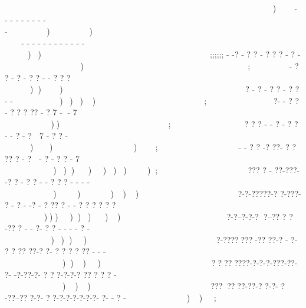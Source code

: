)-- -  - -  -  -  -  - -))   - - - - -  - - - - - - -       )) ; ; ; ; ; ;       - -? - ?  ? - ? ?  ? - ? -          ) ;     - ? ? - ?  - ?  ? - - ?  ? ?                  )))     ? - ?  - ?  ?  - ?   ?  - -                      ))));  ?-  - ?  ?  - ?  ? ? ?? - ?  7   -     -    7         )) ; ? ? ? - - ? - ? ? -   - ?   - ?    7 - ? ? -             )));  - -  ?  ? -? ??- ? ? ??  ? -  ?  - ?   - ?  ? -  7       ))))))));  ??? ?  - ??-???- -?  ?  - ? ?    - - ? ? ?  -  -   - -     )))))  ?-?-?????-? ?-???- ? - ? -  -? - ? ?? ? - - ? ? ? ? ? ?        ))))))))  ?-?--?-?-? ?--?? ? ?  -?? ? - -    ?- ? ?  -   - -  - ? -         ))))  ?-???????-?? ??-? - ?- ? ? ?? ??-? ?-  ?  ? ? ? ?? - -  -         ))))  ????????-?-?-?-???-??- ?- -?-??-?- ? ? ?-?-?-? ?? ? ? ? -          )))  ???????-??-? ?-?- ?-??--?? ?-?-  ? ?-?-?-?-?-?-?- ?- - ? -           ));  
